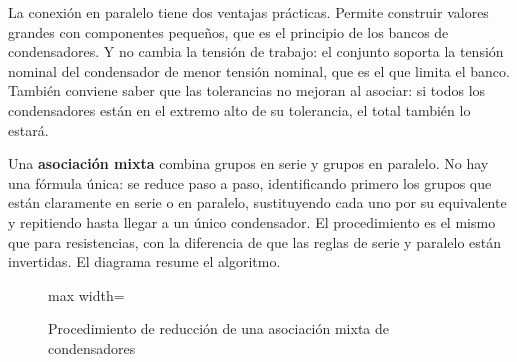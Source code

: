 \documentclass[11pt,letterpaper]{article}
\begin{document}
La conexión en paralelo tiene dos ventajas prácticas. Permite construir valores grandes con componentes pequeños, que es el principio de los bancos de condensadores. Y no cambia la tensión de trabajo: el conjunto soporta la tensión nominal del condensador de menor tensión nominal, que es el que limita el banco. También conviene saber que las tolerancias no mejoran al asociar: si todos los condensadores están en el extremo alto de su tolerancia, el total también lo estará.

Una \textbf{asociación mixta} combina grupos en serie y grupos en paralelo. No hay una fórmula única: se reduce paso a paso, identificando primero los grupos que están claramente en serie o en paralelo, sustituyendo cada uno por su equivalente y repitiendo hasta llegar a un único condensador. El procedimiento es el mismo que para resistencias, con la diferencia de que las reglas de serie y paralelo están invertidas. El diagrama resume el algoritmo.

\begin{figure}[H]
  \centering
  \begin{adjustbox}{max width=\linewidth}
  \end{adjustbox}
  \caption{Procedimiento de reducción de una asociación mixta de condensadores}
\end{figure}
\end{document}
